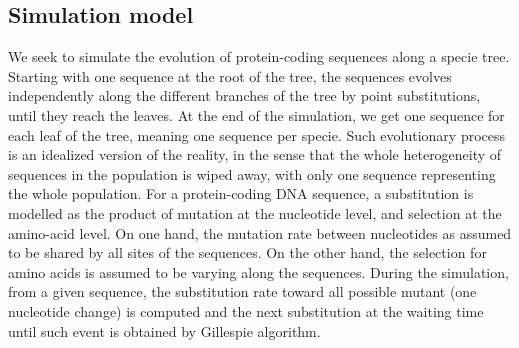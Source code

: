 \subsection{Simulation model}
\label{sec-mut-bias:simu}
We seek to simulate the evolution of protein-coding sequences along a specie tree.
Starting with one sequence at the root of the tree, the sequences evolves independently along the different branches of the tree by point substitutions, until they reach the leaves.
At the end of the simulation, we get one sequence for each leaf of the tree, meaning one sequence per specie.
Such evolutionary process is an idealized version of the reality, in the sense that the whole heterogeneity of sequences in the population is wiped away, with only one sequence representing the whole population.
For a protein-coding \acrshort{DNA} sequence, a substitution is modelled as the product of mutation at the nucleotide level, and selection at the amino-acid level.
On one hand, the mutation rate between nucleotides as assumed to be shared by all sites of the sequences.
On the other hand, the selection for amino acids is assumed to be varying along the sequences.
During the simulation, from a given sequence, the substitution rate toward all possible mutant (one nucleotide change) is computed and the next substitution at the waiting time until such event is obtained by Gillespie algorithm.

